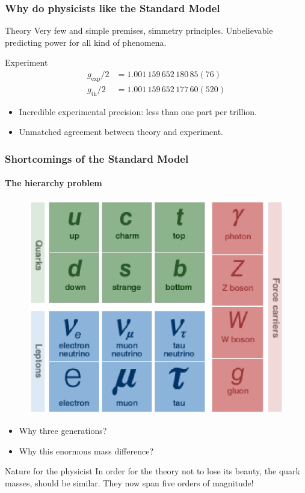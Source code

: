 \documentclass[ukenglish]{beamer}
\begin{document}
\begin{frame}
    \frametitle{Why do physicists like the Standard Model}
    \begin{block}
        {Theory}
        Very few and simple premises, simmetry principles. Unbelievable
        predicting power for all kind of phenomena.
    \end{block}
    \begin{block}
        {Experiment}
        \begin{align*}
    g_{\text{exp}}/2 &= 1.001\,159\,652\,180\,85(76)\\
    g_{\text{th}}/2 &= 1.001\,159\,652\,177\,60(520)
        \end{align*}
        \begin{itemize}
            \item Incredible experimental precision: less than one part per
                trillion.
            \item Unmatched agreement between theory and experiment.
        \end{itemize}
    \end{block}
\end{frame}

\begin{frame}
    \frametitle{Shortcomings of the Standard Model}
    \framesubtitle{The hierarchy problem}
    \begin{figure}[h!]
        \centering
        \includegraphics[width=.35\textwidth]{standard_model_particles}
    \end{figure}
    \begin{itemize}
        \item Why three generations?
        \item Why this enormous mass difference?
    \end{itemize}
    \begin{block}
        {Nature for the physicist}
        In order for the theory not to lose its beauty, the quark masses,
        should be similar. They now span five orders of magnitude!
    \end{block}
\end{frame}
\end{document}
